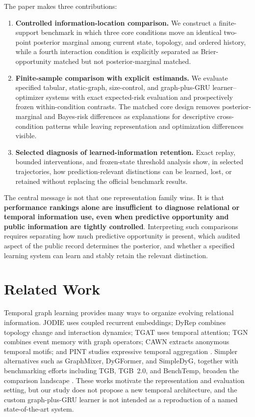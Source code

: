 \documentclass[11pt]{article}
\begin{document}
The paper makes three contributions:
\begin{enumerate}
\item \textbf{Controlled information-location comparison.} We construct a finite-support benchmark in which three core conditions move an identical two-point posterior marginal among current state, topology, and ordered history, while a fourth interaction condition is explicitly separated as Brier-opportunity matched but not posterior-marginal matched.
\item \textbf{Finite-sample comparison with explicit estimands.} We evaluate specified tabular, static-graph, size-control, and graph-plus-GRU learner--optimizer systems with exact expected-risk evaluation and prospectively frozen within-condition contrasts. The matched core design removes posterior-marginal and Bayes-risk differences as explanations for descriptive cross-condition patterns while leaving representation and optimization differences visible.
\item \textbf{Selected diagnosis of learned-information retention.} Exact replay, bounded interventions, and frozen-state threshold analysis show, in selected trajectories, how prediction-relevant distinctions can be learned, lost, or retained without replacing the official benchmark results.
\end{enumerate}

The central message is not that one representation family wins. It is that \textbf{performance rankings alone are insufficient to diagnose relational or temporal information use, even when predictive opportunity and public information are tightly controlled}. Interpreting such comparisons requires separating how much predictive opportunity is present, which audited aspect of the public record determines the posterior, and whether a specified learning system can learn and stably retain the relevant distinction.

\section{Related Work}

Temporal graph learning provides many ways to organize evolving relational information. JODIE uses coupled recurrent embeddings; DyRep combines topology change and interaction dynamics; TGAT uses temporal attention; TGN combines event memory with graph operators; CAWN extracts anonymous temporal motifs; and PINT studies expressive temporal aggregation \citep{jodie,dyrep,tgat,tgn,cawn,pint}. Simpler alternatives such as GraphMixer, DyGFormer, and SimpleDyG, together with benchmarking efforts including TGB, TGB~2.0, and BenchTemp, broaden the comparison landscape \citep{graphmixer,dygformer,simpledyg,tgb,tgb2,benchtemp}. These works motivate the representation and evaluation setting, but our study does not propose a new temporal architecture, and the custom graph-plus-GRU learner is not intended as a reproduction of a named state-of-the-art system.
\end{document}
